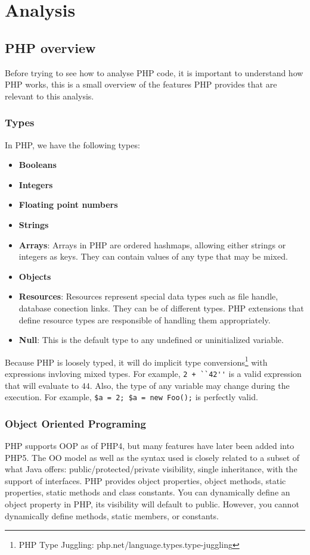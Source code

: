 \documentclass[a4paper]{article}
\begin{document}
\section{Analysis}
\subsection{PHP overview}
Before trying to see how to analyse PHP code, it is important to understand how PHP works,
this is a small overview of the features PHP provides that are relevant to this analysis.
\subsubsection{Types}
In PHP, we have the following types:
\begin{itemize}
  \item \textbf{Booleans}
  \item \textbf{Integers}
  \item \textbf{Floating point numbers}
  \item \textbf{Strings}
  \item \textbf{Arrays}: Arrays in PHP are ordered hashmaps, allowing either strings or
    integers as keys.  They can contain values of any type that may be mixed.
  \item \textbf{Objects}
  \item \textbf{Resources}: Resources represent special data types such as
    file handle, database conection links. They can be of different types. PHP
    extensions that define resource types are responsible of handling them
    appropriately.
  \item \textbf{Null}: This is the default type to any undefined or
    uninitialized variable.
\end{itemize}

Because PHP is loosely typed, it will do implicit type conversions\footnote{PHP
Type Juggling: php.net/language.types.type-juggling} with expressions invloving
mixed types. For example, \verb&2 + ``42''& is a valid expression that will
evaluate to $44$. Also, the type of any variable may change during the
execution.  For example, \verb&$a = 2; $a = new Foo();& is perfectly valid.

\subsubsection{Object Oriented Programing}
PHP supports OOP as of PHP4, but many features have later been added into PHP5.
The OO model as well as the syntax used is closely related to a subset of what
Java offers: public/protected/private visibility, single inheritance, with the
support of interfaces. PHP provides object properties, object methods, static
properties, static methods and class constants. You can dynamically define an
object property in PHP, its visibility will default to public. However, you
cannot dynamically define methods, static members, or constants.
\end{document}

